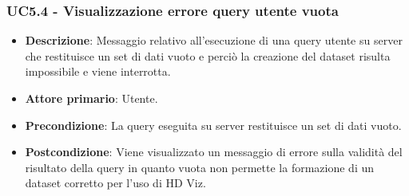 \subsubsection{UC5.4 - Visualizzazione errore query utente vuota}
\label{ssub:uc5.4}
\begin{itemize}
    \item \textbf{Descrizione}: Messaggio relativo all'esecuzione di una query utente su server che restituisce 
                                un set di dati vuoto e
                                perciò la creazione del dataset risulta impossibile e viene interrotta.

    \item \textbf{Attore primario}: Utente.
    
    \item \textbf{Precondizione}:   La query eseguita su server restituisce un set di dati vuoto.

    \item \textbf{Postcondizione}:   Viene visualizzato un messaggio di errore sulla validità del risultato della query 
                                        in quanto vuota non permette la formazione di un dataset corretto per l'uso di HD Viz.


\end{itemize}